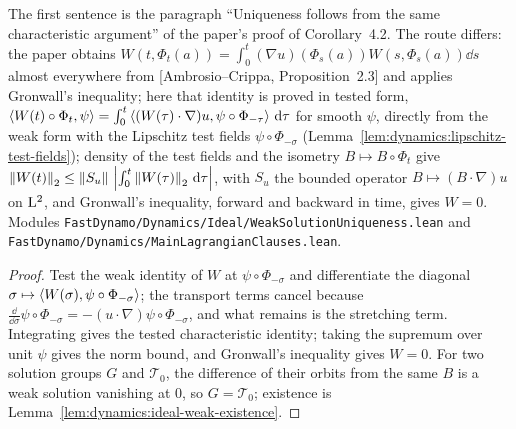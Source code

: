 The first sentence is the paragraph ``Uniqueness follows from the same characteristic
argument'' of the paper's proof of Corollary~4.2.  The route differs: the paper obtains
$W(t,\Phi_t(a))=\int_0^t(\nabla u)(\Phi_s(a))W(s,\Phi_s(a))\dd s$ almost everywhere from
[Ambrosio--Crippa, Proposition~2.3] and applies Gronwall's inequality; here that identity is
proved in tested form,
$\left\langle W(t)\circ\Phi_t,\psi\right\rangle=\int_0^t\left\langle(W(\tau)\cdot\nabla)u,\psi\circ\Phi_{-\tau}\right\rangle\,\mathrm{d}\tau$
for smooth $\psi$, directly from the weak form with the Lipschitz test fields
$\psi\circ\Phi_{-\sigma}$ (Lemma~\ref{lem:dynamics:lipschitz-test-fields}); density of the test
fields and the isometry $B\mapsto B\circ\Phi_t$ give
$\left\|W(t)\right\|_2\leq\left\|S_u\right\|\,\left\lvert\int_0^t\left\|W(\tau)\right\|_2\,\mathrm{d}\tau\right\rvert$, with $S_u$ the bounded
operator $B\mapsto(B\cdot\nabla)u$ on $\mathrm{L}^2$, and Gronwall's inequality,
forward and backward in time, gives $W=0$.  Modules
\texttt{FastDynamo/Dynamics/Ideal/WeakSolutionUniqueness.lean} and
\texttt{FastDynamo/Dynamics/MainLagrangianClauses.lean}.

\begin{proof}
  \leanok
  Test the weak identity of $W$ at $\psi\circ\Phi_{-\sigma}$ and differentiate the diagonal
  $\sigma\mapsto\left\langle W(\sigma),\psi\circ\Phi_{-\sigma}\right\rangle$; the transport terms cancel because
  $\frac{\dd}{\dd\sigma}\psi\circ\Phi_{-\sigma}=-(u\cdot\nabla)\psi\circ\Phi_{-\sigma}$, and what
  remains is the stretching term.  Integrating gives the tested characteristic identity; taking
  the supremum over unit $\psi$ gives the norm bound, and Gronwall's inequality gives $W=0$.
  For two solution groups $G$ and $\mathcal T_0$, the difference of their orbits from the same
  $B$ is a weak solution vanishing at $0$, so $G=\mathcal T_0$; existence is
  Lemma~\ref{lem:dynamics:ideal-weak-existence}.
\end{proof}


